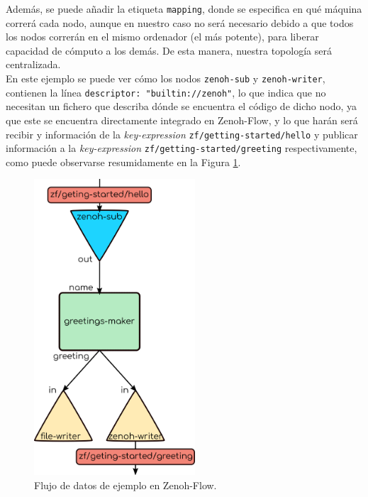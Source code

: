 Además, se puede añadir la etiqueta \verb|mapping|, donde se especifica en qué
máquina correrá cada nodo, aunque en nuestro caso no será necesario debido a que
todos los nodos correrán en el mismo ordenador (el más potente), para liberar
capacidad de cómputo a los demás.
De esta manera, nuestra topología será centralizada.
\\

En este ejemplo se puede ver cómo los nodos \verb|zenoh-sub| y
\verb|zenoh-writer|, contienen la línea \verb|descriptor: "builtin://zenoh"|, lo
que indica que no necesitan un fichero que describa dónde se encuentra el código
de dicho nodo, ya que este se encuentra directamente integrado en Zenoh-Flow, y
lo que harán será recibir y información de la \textit{key-expression}
\verb|zf/getting-started/hello| y publicar información a la
\textit{key-expression} \verb|zf/getting-started/greeting| respectivamente, como
puede observarse resumidamente en la Figura \ref{fig:zf_example}.
\\

\begin{figure} [h!]
  \begin{center}
    \includegraphics[width=6cm]{figs/zenoh_flow_example}
  \end{center}
  \caption{Flujo de datos de ejemplo en Zenoh-Flow.}
  \label{fig:zf_example}
\end{figure}\

